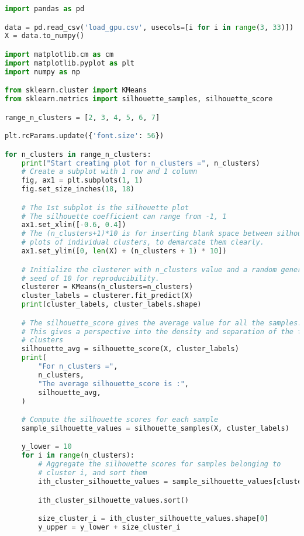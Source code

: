 \begin{lstlisting}[language=Python]
import pandas as pd

data = pd.read_csv('load_gpu.csv', usecols=[i for i in range(3, 33)])
X = data.to_numpy()

import matplotlib.cm as cm
import matplotlib.pyplot as plt
import numpy as np

from sklearn.cluster import KMeans
from sklearn.metrics import silhouette_samples, silhouette_score

range_n_clusters = [2, 3, 4, 5, 6, 7]

plt.rcParams.update({'font.size': 56})

for n_clusters in range_n_clusters:
    print("Start creating plot for n_clusters =", n_clusters)
    # Create a subplot with 1 row and 1 column
    fig, ax1 = plt.subplots(1, 1)
    fig.set_size_inches(18, 18)

    # The 1st subplot is the silhouette plot
    # The silhouette coefficient can range from -1, 1
    ax1.set_xlim([-0.6, 0.4])
    # The (n_clusters+1)*10 is for inserting blank space between silhouette
    # plots of individual clusters, to demarcate them clearly.
    ax1.set_ylim([0, len(X) + (n_clusters + 1) * 10])

    # Initialize the clusterer with n_clusters value and a random generator
    # seed of 10 for reproducibility.
    clusterer = KMeans(n_clusters=n_clusters)
    cluster_labels = clusterer.fit_predict(X)
    print(cluster_labels, cluster_labels.shape)

    # The silhouette_score gives the average value for all the samples.
    # This gives a perspective into the density and separation of the formed
    # clusters
    silhouette_avg = silhouette_score(X, cluster_labels)
    print(
        "For n_clusters =",
        n_clusters,
        "The average silhouette_score is :",
        silhouette_avg,
    )

    # Compute the silhouette scores for each sample
    sample_silhouette_values = silhouette_samples(X, cluster_labels)

    y_lower = 10
    for i in range(n_clusters):
        # Aggregate the silhouette scores for samples belonging to
        # cluster i, and sort them
        ith_cluster_silhouette_values = sample_silhouette_values[cluster_labels == i]

        ith_cluster_silhouette_values.sort()

        size_cluster_i = ith_cluster_silhouette_values.shape[0]
        y_upper = y_lower + size_cluster_i


\end{lstlisting}
